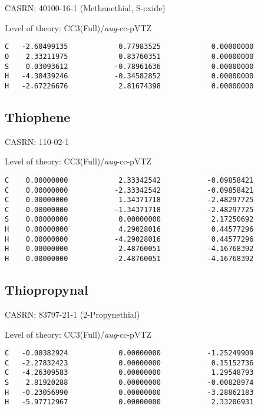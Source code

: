 \documentclass[journal=jctcce,manuscript=article,layout=traditional]{achemso}
\newcommand{\AVTZ}{\emph{aug}-cc-pVTZ}
\begin{document}
CASRN: 40100-16-1 (Methanethial, S-oxide)

\begin{singlespace}
\noindent Level of theory: CC3(Full)/{\AVTZ}
\begin{verbatim}
C   -2.60499135            0.77983525            0.00000000
O    2.33211975            0.83760351            0.00000000
S    0.03093612           -0.78961636            0.00000000
H   -4.30439246           -0.34582852            0.00000000
H   -2.67226676            2.81674398            0.00000000
\end{verbatim}
\end{singlespace}

\subsection{Thiophene}

CASRN:  110-02-1

\begin{singlespace}
\noindent Level of theory: CC3(Full)/{\AVTZ}
\begin{verbatim}
C    0.00000000            2.33342542           -0.09858421
C    0.00000000           -2.33342542           -0.09858421
C    0.00000000            1.34371718           -2.48297725
C    0.00000000           -1.34371718           -2.48297725
S    0.00000000            0.00000000            2.17250692
H    0.00000000            4.29028016            0.44577296
H    0.00000000           -4.29028016            0.44577296
H    0.00000000            2.48760051           -4.16768392
H    0.00000000           -2.48760051           -4.16768392
\end{verbatim}
\end{singlespace}

\subsection{Thiopropynal}

CASRN: 83797-21-1 (2-Propynethial)

\begin{singlespace}
\noindent Level of theory: CC3(Full)/{\AVTZ}
\begin{verbatim}
C   -0.00382924            0.00000000           -1.25249909
C   -2.27832423            0.00000000            0.15152736
C   -4.26309583            0.00000000            1.29548793
S    2.81920288            0.00000000           -0.00828974
H   -0.23056990            0.00000000           -3.28862183
H   -5.97712967            0.00000000            2.33206931
\end{verbatim}
\end{singlespace}
\end{document}
